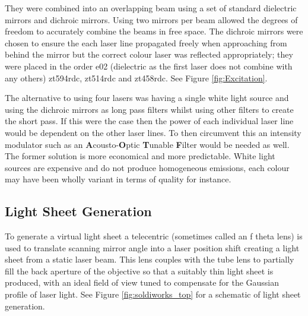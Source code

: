 They were combined into an overlapping beam using a set of standard dielectric mirrors and dichroic mirrors.
Using two mirrors per beam allowed the degrees of freedom to accurately combine the beams in free space.
The dichroic mirrors were chosen to ensure the each laser line propagated freely when approaching from behind the mirror but the correct colour laser was reflected appropriately; they were placed in the order e02 (dielectric as the first laser does not combine with any others) zt594rdc, zt514rdc and zt458rdc.
See Figure \ref{fig:Excitation}.

The alternative to using four lasers was having a single white light source and using the dichroic mirrors as long pass filters whilst using other filters to create the short pass.
If this were the case then the power of each individual laser line would be dependent on the other laser lines.
To then circumvent this an intensity modulator such as an \textbf{A}cousto-\textbf{O}ptic \textbf{T}unable \textbf{F}ilter would be needed as well.
The former solution is more economical and more predictable.
White light sources are expensive and do not produce homogeneous emissions, each colour may have been wholly variant in terms of quality for instance.

\subsection{Light Sheet Generation}
To generate a virtual light sheet a telecentric (sometimes called an f theta lens) is used to translate scanning mirror angle into a laser position shift creating a light sheet from a static laser beam.
This lens couples with the tube lens to partially fill the back aperture of the objective so that a suitably thin light sheet is produced, with an ideal field of view tuned to compensate for the Gaussian profile of laser light.
See Figure \ref{fig:soldiworks_top} for a schematic of light sheet generation.

%


